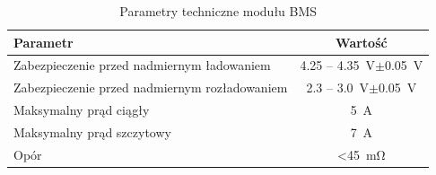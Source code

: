     	\begin{table}[ht]
			\centering
			\begin{tabular}{|l|c|} \hline
				\textbf{Parametr} & \textbf{Wartość} \\
				\hline
				\hline  Zabezpieczenie przed nadmiernym ładowaniem & 4.25 -- \SI{4.35}{\volt}$\pm$\SI{0.05}{\volt}  \\
				\hline 	Zabezpieczenie przed nadmiernym rozładowaniem & 2.3 -- \SI{3.0}{\volt}$\pm$\SI{0.05}{\volt} \\
				\hline 	Maksymalny prąd ciągły& \SI{5}{\ampere} \\
				\hline 	Maksymalny prąd szczytowy & \SI{7}{\ampere} \\
				\hline 	Opór & \SI{<45}{\milli\ohm}  \\
				\hline
			\end{tabular}
			\caption{Parametry techniczne modułu BMS}
			\label{tab:BMS}
		\end{table}
